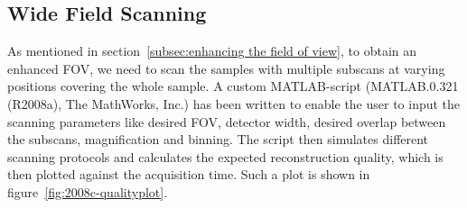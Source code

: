 
\subsection{Wide Field Scanning}
As mentioned in section~\ref{subsec:enhancing the field of view}, to obtain an enhanced FOV, we need to scan the samples with multiple subscans at varying positions covering the whole sample. A custom MATLAB-script (MATLAB.0.321 (R2008a), The MathWorks, Inc.) has been written to enable the user to input the scanning parameters like desired FOV, detector width, desired overlap between the subscans, magnification and binning. The script then simulates different scanning protocols and calculates the expected reconstruction quality, which is then plotted against the acquisition time. Such a plot is shown in figure~\ref{fig:2008c-qualityplot}.

\begin{figure*}
	\centering
	\caption[Quality-Plot of 34 calculated protocols]{Quality-Plot of 34 calculated protocols. The red dots show the expected quality of the different protocols, the black plot is a polynomial fit $p(x)$ with $n=4$ for $p(x)=p_{1}x^{n}+p_{2}x^{n-1}+\cdots+p_{n}x+p_{n+1}$. A subset of 19 protocols have been scanned. Details of these scans are shown in table~\ref{tab:projections} and are discussed in section~\ref{sec:Results}.}%
	\label{fig:2008c-qualityplot}%
\end{figure*}

